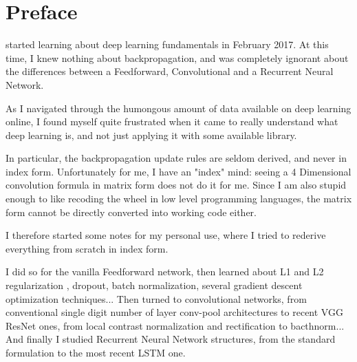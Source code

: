 \chapter{Preface}

 started learning about deep learning fundamentals in February 2017. At this time, I knew nothing about backpropagation, and was completely ignorant about the differences between a Feedforward, Convolutional and a Recurrent Neural Network.

\vspace{0.2cm}

As I navigated through the humongous amount of data available on deep learning online, I found myself quite frustrated when it came to really understand what deep learning is, and not just applying it with some available library. 

\vspace{0.2cm}

In particular, the backpropagation update rules are seldom derived, and never in index form. Unfortunately for me, I have an "index" mind: seeing a 4 Dimensional convolution formula in matrix form does not do it for me. Since I am also stupid enough to like recoding the wheel in low level programming languages, the matrix form cannot be directly converted into working code either. 


\vspace{0.2cm}

I therefore started some notes for my personal use, where I tried to rederive everything from scratch in index form.

\vspace{0.2cm}

I did so for the vanilla Feedforward network, then learned about L1 and L2 regularization , dropout\cite{Srivastava:2014:DSW:2627435.2670313}, batch normalization\cite{Ioffe2015}, several gradient descent optimization techniques... Then turned to convolutional networks, from conventional single digit number of layer conv-pool architectures\cite{Lecun98gradient-basedlearning} to recent VGG\cite{DBLP:journals/corr/SimonyanZ14a} ResNet\cite{He2015} ones, from local contrast normalization and rectification to bacthnorm... And finally I studied Recurrent Neural Network structures\cite{GravesA2016}, from the standard formulation to the most recent LSTM one\cite{Gers:2000:LFC:1121912.1121915}.

\vspace{0.2cm}

